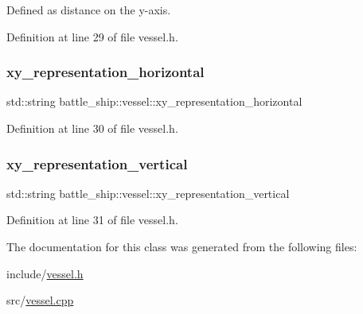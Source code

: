 Defined as distance on the y-\/axis. 



Definition at line 29 of file vessel.\+h.

\mbox{\label{classbattle__ship_1_1vessel_a563ede7bcd45c64f897f727ce2ca50ff}} 
\subsubsection{\texorpdfstring{xy\+\_\+representation\+\_\+horizontal}{xy\_representation\_horizontal}}
{\footnotesize\ttfamily std\+::string battle\+\_\+ship\+::vessel\+::xy\+\_\+representation\+\_\+horizontal\hspace{0.3cm}{\ttfamily [protected]}}



Definition at line 30 of file vessel.\+h.

\mbox{\label{classbattle__ship_1_1vessel_a7ab3092931ae7f230cb2cca77f2612c5}} 
\subsubsection{\texorpdfstring{xy\+\_\+representation\+\_\+vertical}{xy\_representation\_vertical}}
{\footnotesize\ttfamily std\+::string battle\+\_\+ship\+::vessel\+::xy\+\_\+representation\+\_\+vertical\hspace{0.3cm}{\ttfamily [protected]}}



Definition at line 31 of file vessel.\+h.



The documentation for this class was generated from the following files\+:\begin{DoxyCompactItemize}
\item 
include/\hyperlink{vessel_8h}{vessel.\+h}\item 
src/\hyperlink{vessel_8cpp}{vessel.\+cpp}\end{DoxyCompactItemize}

